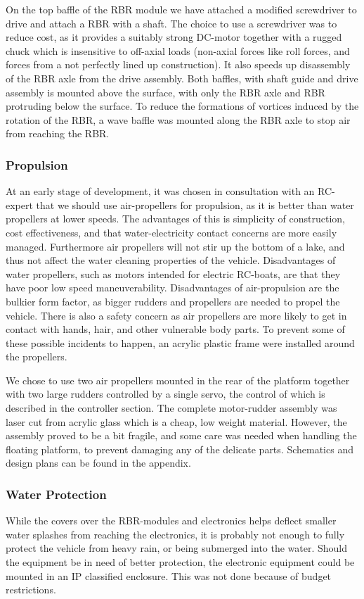 On the top baffle of the RBR module we have attached a modified screwdriver to drive and attach a RBR with a shaft. The choice to use a screwdriver was to reduce cost, as it provides a suitably strong DC-motor together with a rugged chuck which is insensitive to off-axial loads (non-axial forces like roll forces, and forces from a not perfectly lined up construction). It also speeds up disassembly of the RBR axle from the drive assembly. Both baffles, with shaft guide and drive assembly is mounted above the surface, with only the RBR axle and RBR protruding below the surface. To reduce the formations of vortices induced by the rotation of the RBR, a wave baffle was mounted along the RBR axle to stop air from reaching the RBR.

\subsubsection{Propulsion}
At an early stage of development, it was chosen in consultation with an RC-expert that we should use air-propellers for propulsion, as it is better than water propellers at lower speeds. The advantages of this is simplicity of construction, cost effectiveness, and that water-electricity contact concerns are more easily managed. Furthermore air propellers will not stir up the bottom of a lake, and thus not affect the water cleaning properties of the vehicle.
Disadvantages of water propellers, such as motors intended for electric RC-boats, are that they have poor low speed maneuverability. Disadvantages of air-propulsion are the bulkier form factor, as bigger rudders and propellers are needed to propel the vehicle. There is also a safety concern as air propellers are more likely to get in contact with hands, hair, and other vulnerable body parts. To prevent some of these possible incidents to happen, an acrylic plastic frame were installed around the propellers.

We chose to use two air propellers mounted in the rear of the platform together with two large rudders controlled by a single servo, the control of which is described in the controller section. The complete motor-rudder assembly was laser cut from acrylic glass which is a cheap, low weight material. However, the assembly proved to be a bit fragile, and some care was needed when handling the floating platform, to prevent damaging any of the delicate parts. Schematics and design plans can be found in the appendix.

\subsubsection{Water Protection}
While the covers over the RBR-modules and electronics helps deflect smaller water splashes from reaching the electronics, it is probably not enough to fully protect the vehicle from heavy rain, or being submerged into the water. Should the equipment be in need of better protection, the electronic equipment could be mounted in an IP classified enclosure. This was not done because of budget restrictions.
